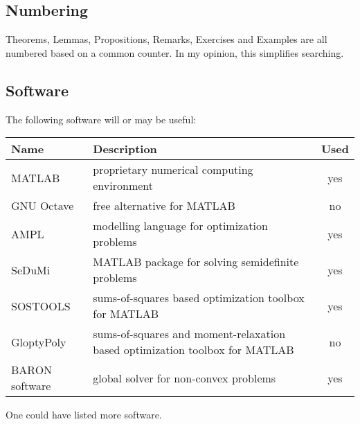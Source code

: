 \subsection{Numbering}

Theorems, Lemmas, Propositions, Remarks, Exercises and Examples are all numbered based on a common counter. In my opinion, this simplifies searching. 

\subsection{Software}

The following software will or may be useful:

\begin{center}
\begin{tabular}{lp{9.7cm}c}
	\textbf{Name} & \textbf{Description} & \textbf{Used}
	\\ \hline MATLAB & proprietary numerical computing environment & yes
	\\ GNU Octave & free alternative for MATLAB & no
	\\ \hline AMPL & modelling language for optimization problems & yes
	\\ \hline SeDuMi & MATLAB package for solving semidefinite problems & yes
	\\ \hline SOSTOOLS & sums-of-squares based optimization toolbox for MATLAB & yes
	\\ GloptyPoly & sums-of-squares and moment-relaxation based optimization toolbox for MATLAB & no
	\\ \hline BARON software &  global solver for non-convex problems & yes
\end{tabular}
\end{center}

One could have listed more software.

